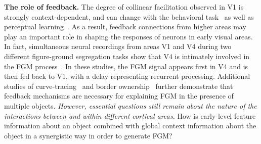 \documentclass[11pt]{article}
\begin{document}

\textbf{The role of feedback.}  The degree of collinear facilitation
observed in V1 is strongly context-dependent, and can change with the
behavioral task~\citep{Li_etal04, Li_etal06} as well as perceptual
learning~\citep{Li_Gilbert_etal08, Yan_etal14}.
As a result, feedback connections from higher areas
may play an important role in shaping the responses of neurons in
early visual areas. In fact, simultaneous neural recordings from areas
V1 and V4 during two different figure-ground segregation tasks show
that V4 is intimately involved in the FGM process~\citep{Poort_etal12,
  Chen_etal14}. In these studies, the FGM signal appears first in V4
and is then fed back to V1, with a delay representing recurrent
processing. Additional studies of
curve-tracing~\citep{Roelfsema_etal98} and border
ownership~\citep{Zhou_etal00, Qiu_etal07, Zhang_vonderHeydt10} further
demonstrate that feedback mechanisms are necessary for explaining FGM
in the presence of multiple objects. \textit{However, essential
  questions still remain about the nature of the interactions between
  and within different cortical areas.} How
    is early-level feature information about an object combined with
    global context information about the object in a synergistic way
    in order to generate FGM?
\end{document}
